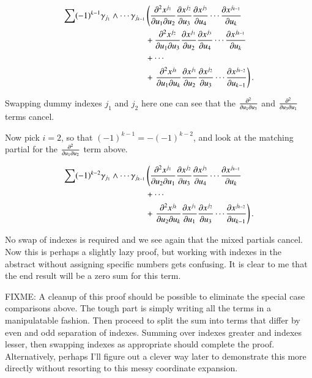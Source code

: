 \begin{align*}
\sum (-1)^{k-1} \gamma_{j_1} \wedge \cdots \gamma_{j_{k-1}} 
&\left(\PDD{u_1}{u_2}{x^{j_1}} \PD{u_3}{x^{j_{2}}} \PD{u_4}{x^{j_3}} \cdots \PD{u_k}{x^{j_{k-1}}}\right. \\
&+\PDD{u_1}{u_3}{x^{j_2}} \PD{u_2}{x^{j_1}} \PD{u_4}{x^{j_3}} \cdots \PD{u_k}{x^{j_{k-1}}} \\
&+\cdots \\
&+\left.\PDD{u_1}{u_k}{x^{j_k}} \PD{u_2}{x^{j_1}} \PD{u_3}{x^{j_2}} \cdots \PD{u_{k-1}}{x^{j_{k-2}}}\right).
\end{align*}

Swapping dummy indexes $j_1$ and $j_2$ here one can see that the 
$\PDD{u_1}{u_3}{}$ and $\PDD{u_3}{u_1}{}$ terms cancel.

Now pick $i=2$, so 
that $(-1)^{k-1} = -(-1)^{k-2}$, and look at the 
matching partial for the $\PDD{u_1}{u_2}{}$ term above.

\begin{align*}
\sum (-1)^{k-2} \gamma_{j_1} \wedge \cdots \gamma_{j_{k-1}} 
&\left(\PDD{u_2}{u_1}{x^{j_1}} \PD{u_3}{x^{j_{2}}} \PD{u_4}{x^{j_3}} \cdots \PD{u_k}{x^{j_{k-1}}}\right. \\
&+\cdots \\
&+\left.\PDD{u_2}{u_k}{x^{j_k}} \PD{u_1}{x^{j_1}} \PD{u_3}{x^{j_2}} \cdots \PD{u_{k-1}}{x^{j_{k-2}}}\right).
\end{align*}

No swap of indexes is required and we see again that the mixed partials cancel.  Now this is perhaps a slightly lazy proof, but working with
indexes in the abstract without assigning specific numbers gets confusing.  It is clear to me that the end result will be a zero sum for this term.

FIXME: A cleanup of this proof should be possible to eliminate the special case comparisons above.  The tough part is simply writing all the terms
in a manipulatable fashion.  Then proceed to split the sum into terms that differ by even and odd separation of indexes.  Summing over indexes greater and indexes lesser, then swapping indexes as appropriate should complete the proof.
Alternatively, perhaps I'll figure out a clever way later to demonstrate this more directly without resorting to this messy coordinate expansion.
